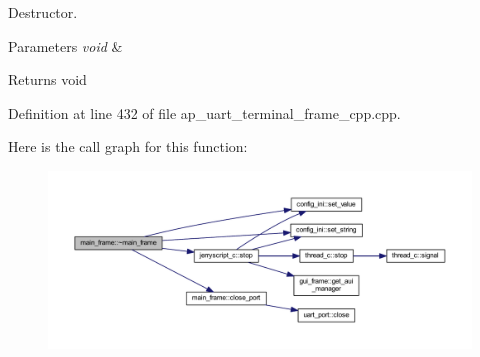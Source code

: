 Destructor. 


\begin{DoxyParams}{Parameters}
{\em void} & \\
\hline
\end{DoxyParams}
\begin{DoxyReturn}{Returns}
void 
\end{DoxyReturn}


Definition at line 432 of file ap\+\_\+uart\+\_\+terminal\+\_\+frame\+\_\+cpp.\+cpp.

Here is the call graph for this function\+:
\nopagebreak
\begin{figure}[H]
\begin{center}
\leavevmode
\includegraphics[width=350pt]{group___u_a_r_t__terminal_gac90714016e56999e76bfee3f50063f5c_cgraph}
\end{center}
\end{figure}
